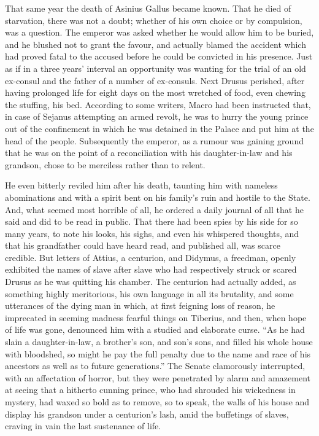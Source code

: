 
That same year the death of Asinius Gallus became known. That he died of starvation, there was not a doubt; whether of his own choice or by compulsion, was a question. The emperor was asked whether he would allow him to be buried, and he blushed not to grant the favour, and actually blamed the accident which had proved fatal to the accused before he could be convicted in his presence. Just as if in a three years' interval an opportunity was wanting for the trial of an old ex-consul and the father of a number of ex-consuls. Next Drusus perished, after having prolonged life for eight days on the most wretched of food, even chewing the stuffing, his bed. According to some writers, Macro had been instructed that, in case of Sejanus attempting an armed revolt, he was to hurry the young prince out of the confinement in which he was detained in the Palace and put him at the head of the people. Subsequently the emperor, as a rumour was gaining ground that he was on the point of a reconciliation with his daughter-in-law and his grandson, chose to be merciless rather than to relent.


He even bitterly reviled him after his death, taunting him with nameless abominations and with a spirit bent on his family's ruin and hostile to the State. And, what seemed most horrible of all, he ordered a daily journal of all that he said and did to be read in public. That there had been spies by his side for so many years, to note his looks, his sighs, and even his whispered thoughts, and that his grandfather could have heard read, and published all, was scarce credible. But letters of Attius, a centurion, and Didymus, a freedman, openly exhibited the names of slave after slave who had respectively struck or scared Drusus as he was quitting his chamber. The centurion had actually added, as something highly meritorious, his own language in all its brutality, and some utterances of the dying man in which, at first feigning loss of reason, he imprecated in seeming madness fearful things on Tiberius, and then, when hope of life was gone, denounced him with a studied and elaborate curse. ``As he had slain a daughter-in-law, a brother's son, and son's sons, and filled his whole house with bloodshed, so might he pay the full penalty due to the name and race of his ancestors as well as to future generations.'' The Senate clamorously interrupted, with an affectation of horror, but they were penetrated by alarm and amazement at seeing that a hitherto cunning prince, who had shrouded his wickedness in mystery, had waxed so bold as to remove, so to speak, the walls of his house and display his grandson under a centurion's lash, amid the buffetings of slaves, craving in vain the last sustenance of life.

